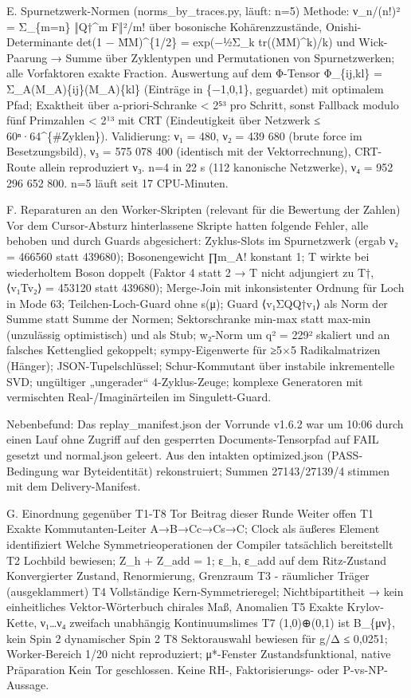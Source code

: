 E. Spurnetzwerk-Normen (norms\_by\_traces.py, läuft: n=5) Methode:
ν\_n/(n!)² = Σ\_\{\textbar m\textbar=n\} ‖Q†\^{}m F‖²/m! über bosonische
Kohärenzzustände, Onishi-Determinante det(1 − M̄M)\^{}\{1/2\} =
exp(−½Σ\_k tr((M̄M)\^{}k)/k) und Wick-Paarung → Summe über Zyklentypen
und Permutationen von Spurnetzwerken; alle Vorfaktoren exakte Fraction.
Auswertung auf dem Φ-Tensor Φ\_\{ij,kl\} = Σ\_A(M\_A)\{ij\}(M\_A)\{kl\}
(Einträge in \{−1,0,1\}, geguardet) mit optimalem Pfad; Exaktheit über
a-priori-Schranke \textless{} 2⁵³ pro Schritt, sonst Fallback modulo
fünf Primzahlen \textless{} 2¹³ mit CRT (Eindeutigkeit über
\textbar Netzwerk\textbar{} ≤ 60ⁿ·64\^{}\{\#Zyklen\}). Validierung: ν₁ =
480, ν₂ = 439 680 (brute force im Besetzungsbild), ν₃ = 575 078 400
(identisch mit der Vektorrechnung), CRT-Route allein reproduziert ν₃.
n=4 in 22 s (112 kanonische Netzwerke), ν₄ = 952 296 652 800. n=5 läuft
seit 17 CPU-Minuten.

F. Reparaturen an den Worker-Skripten (relevant für die Bewertung der
Zahlen) Vor dem Cursor-Absturz hinterlassene Skripte hatten folgende
Fehler, alle behoben und durch Guards abgesichert: Zyklus-Slots im
Spurnetzwerk (ergab ν₂ = 466560 statt 439680); Bosonengewicht ∏m\_A!
konstant 1; T wirkte bei wiederholtem Boson doppelt (Faktor 4 statt 2 →
T nicht adjungiert zu T†, ⟨v₁\textbar Tv₂⟩ = 453120 statt 439680);
Merge-Join mit inkonsistenter Ordnung für Loch in Mode 63;
Teilchen-Loch-Guard ohne s(μ); Guard ⟨v₁\textbar ΣQQ†\textbar v₁⟩ als
Norm der Summe statt Summe der Normen; Sektorschranke min-max statt
max-min (unzulässig optimistisch) und als Stub; w₂-Norm um q² = 229²
skaliert und an falsches Kettenglied gekoppelt; sympy-Eigenwerte für
≥5×5 Radikalmatrizen (Hänger); JSON-Tupelschlüssel; Schur-Kommutant über
instabile inkrementelle SVD; ungültiger „ungerader`` 4-Zyklus-Zeuge;
komplexe Generatoren mit vermischten Real-/Imaginärteilen im
Singulett-Guard.

Nebenbefund: Das replay\_manifest.json der Vorrunde v1.6.2 war um 10:06
durch einen Lauf ohne Zugriff auf den gesperrten Documents-Tensorpfad
auf FAIL gesetzt und normal.json geleert. Aus den intakten
optimized.json (PASS-Bedingung war Byteidentität) rekonstruiert; Summen
27143/27139/4 stimmen mit dem Delivery-Manifest.

G. Einordnung gegenüber T1-T8 Tor Beitrag dieser Runde Weiter offen T1
Exakte Kommutanten-Leiter A→B→Cc→Cs→C; Clock als äußeres Element
identifiziert Welche Symmetrieoperationen der Compiler tatsächlich
bereitstellt T2 Lochbild bewiesen; Z\_h + Z\_add = 1; ε\_h, ε\_add auf
dem Ritz-Zustand Konvergierter Zustand, Renormierung, Grenzraum T3 -
räumlicher Träger (ausgeklammert) T4 Vollständige Kern-Symmetrieregel;
Nichtbipartitheit → kein einheitliches Vektor-Wörterbuch chirales Maß,
Anomalien T5 Exakte Krylov-Kette, ν₁\ldots ν₄ zweifach unabhängig
Kontinuumslimes T7 (1,0)⊕\allowbreak{}(0,1) ist B\_\{μν\}, kein Spin 2 dynamischer
Spin 2 T8 Sektorauswahl bewiesen für g/Δ ≤ 0,0251; Worker-Bereich 1/20
nicht reproduziert; μ*-Fenster Zustandsfunktional, native Präparation
Kein Tor geschlossen. Keine RH-, Faktorisierungs- oder P-vs-NP-Aussage.

